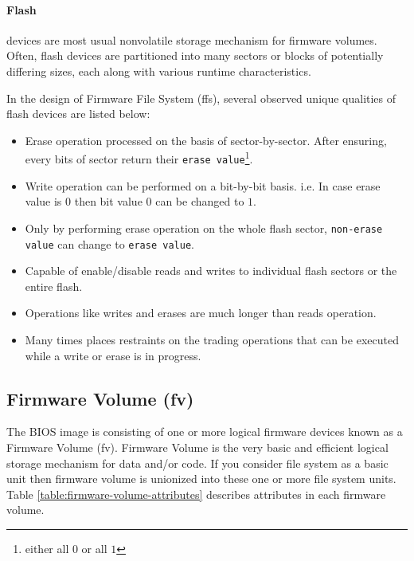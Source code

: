 \paragraph{Flash} devices are most usual nonvolatile storage mechanism for firmware volumes. Often, flash devices are partitioned into many sectors or blocks of potentially differing sizes, each along with various runtime characteristics.

In the design of Firmware File System (\gls{ffs}), several observed unique qualities of flash devices are listed below:
\begin{itemize}
	\item Erase operation processed on the basis of sector-by-sector. After ensuring, every bits of sector return their \verb|erase value|\footnote{either all $0$ or all $1$}.
	\item Write operation can be performed on a bit-by-bit basis. i.e. In case erase value is $ 0 $ then bit value $ 0 $ can be changed to $ 1 $.
	\item Only by performing erase operation on the whole flash sector, \verb|non-erase value| can change to \verb|erase value|.
	\item Capable of enable/disable reads and writes to individual flash sectors or the entire flash.
	\item Operations like writes and erases are much longer than reads operation.
	\item Many times places restraints on the trading operations that can be executed while a write or erase is in progress.
\end{itemize}

\subsection{Firmware Volume (\gls{fv})}
The BIOS image is consisting of one or more logical firmware devices known as a Firmware Volume (\gls{fv}). Firmware Volume is the very basic and efficient logical storage mechanism for data and/or code. If you consider file system as a basic unit then firmware volume is unionized into these one or more file system units.
Table \ref{table:firmware-volume-attributes} describes attributes in each firmware volume.

